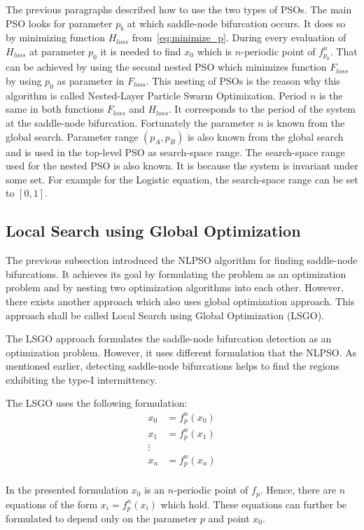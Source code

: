 \par
The previous paragraphs described how to use the two types of PSOs.
The main PSO looks for parameter $p_b$ at which saddle-node bifurcation occurs.
It does so by minimizing function $H_{loss}$ from~\eqref{eq:minimize_p}.
During every evaluation of $H_{loss}$ at parameter $p_0$ it is needed to find $x_0$ which is $n$-periodic point of $f^{n}_{p_0}$.
That can be achieved by using the second nested PSO which minimizes function $F_{loss}$ by using $p_0$ as parameter in $F_{loss}$.
This nesting of PSOs is the reason why this algorithm is called Nested-Layer Particle Swarm Optimization.
Period $n$ is the same in both functions $F_{loss}$ and $H_{loss}$.
It corresponds to the period of the system at the saddle-node bifurcation.
Fortunately the parameter $n$ is known from the global search.
Parameter range $(p_A, p_B)$ is also known from the global search and is used in the top-level PSO as search-space range.
The search-space range used for the nested PSO is also known.
It is because the system is invariant under some set.
For example for the Logistic equation, the search-space range can be set to $[0, 1]$.

\subsection{Local Search using Global Optimization}
The previous subsection introduced the NLPSO algorithm for finding saddle-node bifurcations.
It achieves its goal by formulating the problem as an optimization problem and by nesting two optimization algorithms into each other.
However, there exists another approach which also uses global optimization approach.
This approach shall be called Local Search using Global Optimization (LSGO).
\par
The LSGO approach formulates the saddle-node bifurcation detection as an optimization problem.
However, it uses different formulation that the NLPSO.
As mentioned earlier, detecting saddle-node bifurcations helps to find the regions exhibiting the type-I intermittency.
\par
The LSGO uses the following formulation:
\begin{align*} 
x_0 &= f_{p}^{n}(x_0)\\
x_1 &= f_{p}^{n}(x_1)\\
\vdots \\
x_n &= f_{p}^{n}(x_n)\\
\end{align*}

In the presented formulation $x_0$ is an $n$-periodic point of $f_{p}$.
Hence, there are $n$ equations of the form $x_i = f_{p}^{n}(x_i)$ which hold.
These equations can further be formulated to depend only on the parameter $p$ and point $x_0$.

